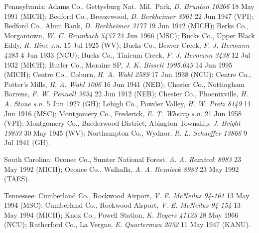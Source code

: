 \documentclass{article}
\begin{document}
Pennsylvania:
Adams Co., Gettysburg Nat.~Mil.~Park, \textit{D. Brunton 10266} 18 May 1991 (MICH); 
Bedford Co., Breezewood, \textit{D. Berkheimer 8901} 22 Jun 1947 (VPI); 
Bedford Co., Alum Bank, \textit{D. Berkheimer 3177} 19 Jun 1942 (MICH); 
Berks Co., Morgantown, \textit{W. C. Brumbach 5457} 24 Jun 1966 (MSC); 
Bucks Co., Upper Black Eddy, \textit{R. Hine s.n.} 15 Jul 1925 (WV); 
Bucks Co., Beaver Creek, \textit{F. J. Hermann 4285} 4 Jun 1933 (NCU); 
Bucks Co., Tinicum Creek, \textit{F. J. Hermann 3438} 12 Jul 1932 (MICH); 
Butler Co., Moraine SP, \textit{J. K. Bissell 1995:049} 14 Jun 1995 (MICH); 
Centre Co., Coburn, \textit{H. A. Wahl 2589} 17 Jun 1938 (NCU); 
Centre Co., Potter's Mills, \textit{H. A. Wahl 1006} 16 Jun 1941 (NEB); 
Chester Co., Nottingham Barrens, \textit{F. W. Pennell 3694} 22 Jun 1912 (NEB); 
Chester Co., Phoenixville, \textit{H. A. Stone s.n.} 5 Jun 1927 (GH); 
Lehigh Co., Powder Valley, \textit{H. W. Pretz 8149} 11 Jun 1916 (MSC); 
Montgomery Co., Frederick, \textit{E. T. Wherry s.n.} 21 Jun 1958 (VPI); 
Montgomery Co., Baederwood District, Abington Township, \textit{J. Bright 19833} 30 May 1945 (WV); 
Northampton Co., Wydnor, \textit{R. L. Schaeffer 13866} 9 Jul 1941 (GH). 

South Carolina:
Oconee Co., Sumter National Forest, \textit{A. A. Reznicek 8983} 23 May 1992 (MICH); 
Oconee Co., Walhalla, \textit{A. A. Reznicek 8983} 23 May 1992 (TAES). 

Tennessee:
Cumberland Co., Rockwood Airport, \textit{V. E. McNeilus 94-161} 13 May 1994 (MSC); 
Cumberland Co., Rockwood Airport, \textit{V. E. McNeilus 94-154} 13 May 1994 (MICH); 
Knox Co., Powell Station, \textit{K. Rogers 41123} 28 May 1966 (NCU); 
Rutherford Co., La Vergne, \textit{E. Quarterman 2032} 11 May 1947 (KANU). 
\end{document}
